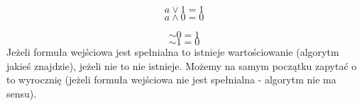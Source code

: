 \documentclass[a4paper,12pt]{article}
\begin{document}
$$ a \vee 1 = 1\ $$
$$ a \wedge 0 = 0\ $$

$$ \sim 0 = 1\ $$
$$ \sim 1 = 0\ $$
Jeżeli formuła wejściowa jest spełnialna to istnieje wartościowanie (algorytm jakieś znajdzie), jeżeli nie to nie istnieje. Możemy na samym początku zapytać o to wyrocznię (jeżeli formuła wejściowa nie jest spełnialna - algorytm nie ma sensu).
\end{document}
